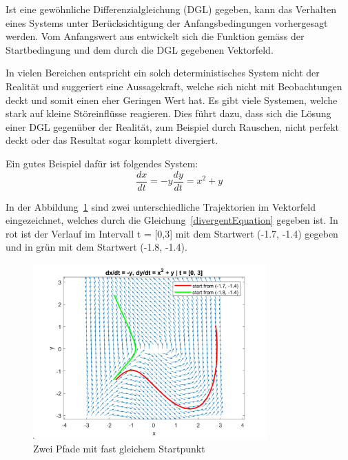 Ist eine gewöhnliche Differenzialgleichung (DGL) gegeben, kann das Verhalten eines Systems unter Berücksichtigung der Anfangsbedingungen vorhergesagt werden. Vom Anfangswert aus entwickelt sich die Funktion gemäss der Startbedingung und dem durch die DGL gegebenen Vektorfeld. %

In vielen Bereichen entspricht ein solch deterministisches System  nicht der Realität und suggeriert eine Aussagekraft, welche sich nicht mit Beobachtungen deckt und somit einen eher Geringen Wert hat. Es gibt viele Systemen, welche stark auf kleine Störeinflüsse reagieren. Dies führt dazu, dass sich die Lösung einer DGL gegenüber der Realität, zum Beispiel durch Rauschen, nicht perfekt deckt oder das Resultat sogar komplett divergiert.

Ein gutes Beispiel dafür ist folgendes System:
\begin{equation}
	\frac{dx}{dt} = - y
	\frac{dy}{dt} = x^2 + y
	\label{divergentEquation}
\end{equation}

In der Abbildung~\ref{divergentAndConvergentSystem} sind zwei unterschiedliche Trajektorien im Vektorfeld eingezeichnet, welches durch die Gleichung~\ref{divergentEquation} gegeben ist. In rot ist der Verlauf im Intervall  t = [0,3] mit dem Startwert (-1.7, -1.4) gegeben und in grün mit dem Startwert (-1.8, -1.4).

\begin{figure}
	\centering
	\includegraphics[width=0.8\textwidth]{papers/brown/images/Vektorfeld-mit-zwei-Pfaden.png}
	\caption{Zwei Pfade mit fast gleichem Startpunkt}
	\label{divergentAndConvergentSystem}
\end{figure}

